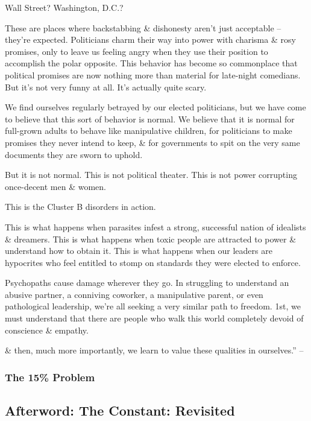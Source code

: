 \documentclass{article}
\numberwithin{equation}{section}
\begin{document}
Wall Street? Washington, D.C.?

These are places where backstabbing \& dishonesty aren't just acceptable -- they're expected. Politicians charm their way into power with charisma \& rosy promises, only to leave us feeling angry when they use their position to accomplish the polar opposite. This behavior has become so commonplace that political promises are now nothing more than material for late-night comedians. But it's not very funny at all. It's actually quite scary.

We find ourselves regularly betrayed by our elected politicians, but we have come to believe that this sort of behavior is normal. We believe that it is normal for full-grown adults to behave like manipulative children, for politicians to make promises they never intend to keep, \& for governments to spit on the very same documents they are sworn to uphold.

But it is not normal. This is not political theater. This is not power corrupting once-decent men \& women.

This is the Cluster B disorders in action.

This is what happens when parasites infest a strong, successful nation of idealists \& dreamers. This is what happens when toxic people are attracted to power \& understand how to obtain it. This is what happens when our leaders are hypocrites who feel entitled to stomp on standards they were elected to enforce.

Psychopaths cause damage wherever they go. In struggling to understand an abusive partner, a conniving coworker, a manipulative parent, or even pathological leadership, we're all seeking a very similar path to freedom. 1st, we must understand that there are people who walk this world completely devoid of conscience \& empathy.

\& then, much more importantly, we learn to value these qualities in ourselves.'' -- \cite[pp. 189--191]{MacKenzie2015}

\subsubsection{The 15\% Problem}

\subsection{Afterword: The Constant: Revisited}


\printbibliography[heading=bibintoc]
	
\end{document}
